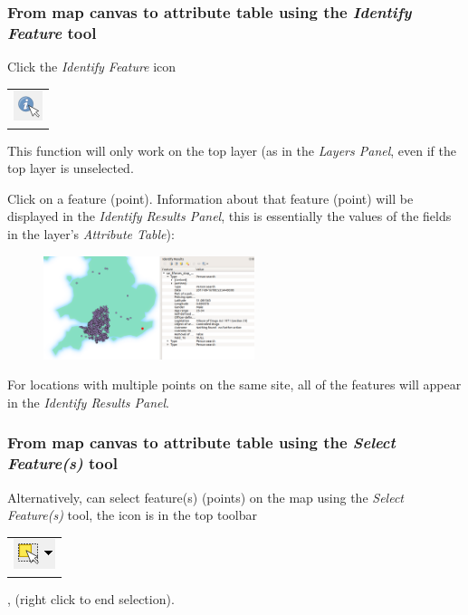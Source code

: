 \subsubsection{From map canvas to attribute table using the \textit{Identify Feature} tool}

Click the \textit{Identify Feature} icon 
\begin{tabular}{@{}c@{}}\includegraphics[width=4ex]{images/identify_feature_icon.png}\end{tabular}

This function will only work on the top layer (as in the \textit{Layers Panel}, even if the top layer is unselected.

Click on a feature (point). Information about that feature (point) will be displayed in the \textit{Identify Results Panel}, this is essentially the values of the fields in the layer's \textit{Attribute Table}):  

\begin{figure}[!h]
	\centering
	\includegraphics[width=0.55\textwidth]{images/stop_search_identify_feature.png}%
	\caption{}
	\label{ft_fig_firstfig3}
\end{figure}

For locations with multiple points on the same site, all of the features will appear in the \textit{Identify Results Panel}.

\subsubsection{From map canvas to attribute table using the \textit{Select Feature(s)} tool}

Alternatively, can select feature(s) (points) on the map using the \textit{Select Feature(s)} tool, the icon is in the top toolbar
\begin{tabular}{@{}c@{}}\includegraphics[width=4ex]{images/select_features_by_polygon_icon.png}\end{tabular}
, (right click to end selection).

